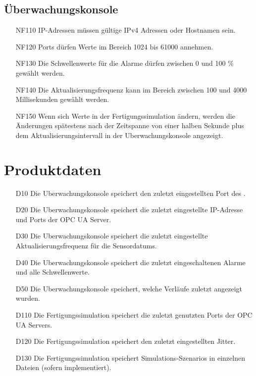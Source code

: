 \documentclass[parskip=full]{scrartcl}
\begin{document}
\subsection{Überwachungskonsole}
\begin{enumerate}
  \item[NF110] IP-Adressen müssen gültige IPv4 Adressen oder Hostnamen sein. %
  \item[NF120] Ports dürfen Werte im Bereich 1024 bis 61000 annehmen.
  \item[NF130] Die Schwellenwerte für die Alarme dürfen zwischen 0 und 100 \% gewählt werden.
  \item[NF140] Die Aktualisierungsfrequenz kann im Bereich zwischen 100 und 4000 Millisekunden gewählt werden.
  \item[NF150] Wenn sich Werte in der \gls{Fertigungssimulation} ändern, werden die Änderungen spätestens nach der Zeitspanne von
    einer halben Sekunde plus dem Aktualisierungsintervall in der \gls{Uberwachungskonsole} angezeigt.
\end{enumerate}

\pagebreak
\section{Produktdaten}
\begin{enumerate}
  \item[D10] Die \gls{Uberwachungskonsole} speichert den zuletzt eingestellten Port des .
  \item[D20] Die \gls{Uberwachungskonsole} speichert die zuletzt eingestellte IP-Adresse und Ports der \gls{OPC UA Server}.
  \item[D30] Die \gls{Uberwachungskonsole} speichert die zuletzt eingestellte Aktualisierungsfrequenz für die \glspl{Sensordatum}.
  \item[D40] Die \gls{Uberwachungskonsole} speichert die zuletzt eingeschaltenen Alarme und alle Schwellenwerte.
  \item[D50] Die \gls{Uberwachungskonsole} speichert, welche Verläufe zuletzt angezeigt wurden.
  \item[D110] Die \gls{Fertigungssimulation} speichert die zuletzt genutzten Ports der \glspl{OPC UA Server}.
  \item[D120] Die \gls{Fertigungssimulation} speichert den zuletzt eingestellten \gls{Jitter}.
  \item[D130] Die \gls{Fertigungssimulation} speichert \glspl{Simulations-Szenario} in einzelnen Dateien (sofern implementiert).
\end{enumerate}
\end{document}
